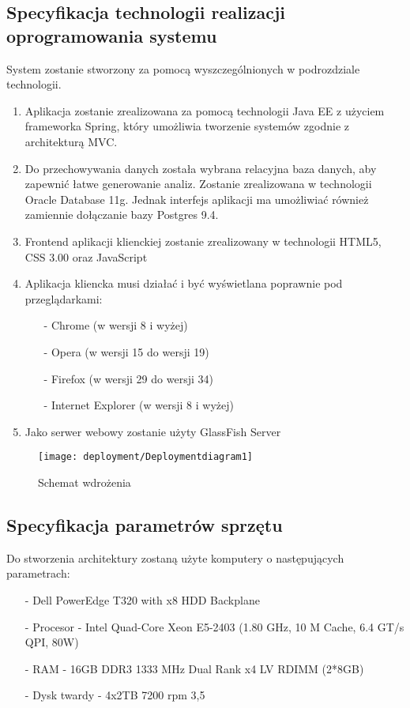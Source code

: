 \subsection{Specyfikacja technologii realizacji oprogramowania systemu}
System zostanie stworzony za pomocą wyszczególnionych w podrozdziale technologii.
\begin{enumerate}
	\item Aplikacja zostanie zrealizowana za pomocą technologii Java EE z użyciem frameworka Spring, który umożliwia tworzenie systemów zgodnie z architekturą MVC.
	\item Do przechowywania danych została wybrana relacyjna baza danych, aby zapewnić łatwe generowanie analiz. Zostanie zrealizowana w technologii Oracle Database 11g. Jednak interfejs aplikacji ma umożliwiać również zamiennie dołączanie bazy Postgres 9.4.
	\item Frontend aplikacji klienckiej zostanie zrealizowany w technologii HTML5, CSS 3.00 oraz JavaScript
	\item Aplikacja kliencka musi działać i być wyświetlana poprawnie pod przeglądarkami:
	\begin{itemize}
	 \item[-] Chrome (w wersji 8 i wyżej)
	 \item[-] Opera (w wersji 15 do wersji 19)
	 \item[-] Firefox (w wersji 29 do wersji 34)
	 \item[-] Internet Explorer (w wersji 8 i wyżej)
	 \end{itemize}
	\item Jako serwer webowy zostanie użyty GlassFish Server
\end{enumerate}

\begin{figure}[H]
    \centering
	\texttt{[image: deployment/Deploymentdiagram1]}
    \caption{Schemat wdrożenia}
    \label{fig:Deploymentdiagram1}
\end{figure}

\subsection{Specyfikacja parametrów sprzętu}
Do stworzenia architektury zostaną użyte komputery o następujących parametrach:
\begin{itemize}
\item[-] Dell PowerEdge T320 with x8 HDD Backplane 
\item[-] Procesor - Intel Quad-Core Xeon E5-2403 (1.80 GHz, 10 M Cache, 6.4 GT/s QPI, 80W)
\item[-] RAM - 16GB DDR3 1333 MHz Dual Rank x4 LV RDIMM (2*8GB)
\item[-] Dysk twardy - 4x2TB 7200 rpm 3,5
\end{itemize}